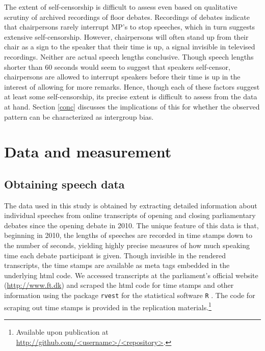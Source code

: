 \documentclass[12pt,a4paper]{article}
\begin{document}
The extent of self-censorship is difficult to assess even based on qualitative scrutiny of archived recordings of floor debates. Recordings of debates indicate that chairpersons rarely interrupt MP's to stop speeches, which in turn suggests extensive self-censorship. However, chairpersons will often stand up from their chair as a sign to the speaker that their time is up, a signal invisible in televised recordings. Neither are actual speech lengths conclusive. Though speech lengths shorter than 60 seconds would seem to suggest that speakers self-censor, chairpersons are allowed to interrupt speakers before their time is up in the interest of allowing for more remarks. Hence, though each of these factors suggest at least some self-censorship, its precise extent is difficult to assess from the data at hand. Section \ref{conc} discusses the implications of this for whether the observed pattern can be characterized as intergroup bias.




\section{Data and measurement}\label{data}

\subsection{Obtaining speech data}
The data used in this study is obtained by extracting detailed information about individual speeches from online transcripts of opening and closing parliamentary debates since the opening debate in 2010. The unique feature of this data is that, beginning in 2010, the lengths of speeches are recorded in time stamps down to the number of seconds, yielding highly precise measures of how much speaking time each debate participant is given. Though invisible in the rendered transcripts, the time stamps are available as meta tags embedded in the underlying html code. We accessed transcripts at the parliament's official website (\url{http://www.ft.dk}) and scraped the html code for time stamps and other information using the package \texttt{rvest} for the statistical software \texttt{R} \citep{RDevelopmentCoreTeam2011}. The code for scraping out time stamps is provided in the replication materials.\footnote{Available upon publication at \url{http://github.com/<username>/<repository>}.}
\end{document}
